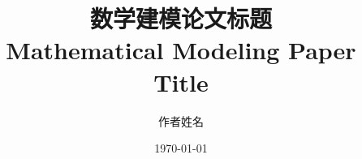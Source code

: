 \documentclass[UTF8]{ctexart}
\begin{document}
\title{\textbf{数学建模论文标题 \\ Mathematical Modeling Paper Title}}
\author{作者姓名}
\date{\today}
\maketitle
















\appendix

\end{document}
